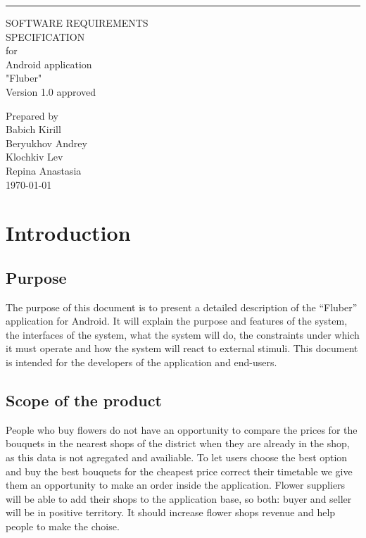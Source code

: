 \documentclass{scrreprt}
\date{}
\def\myversion{1.0 }
\begin{document}
\begin{flushright}
   \rule{16cm}{5pt}\vskip1cm
    \begin{bfseries}
        \thispagestyle{empty} %
        \begin{center}
        \Huge{SOFTWARE REQUIREMENTS\\ SPECIFICATION}\\
        for\\
        \vspace{1.9cm}
        Android application\\ "Fluber"\\
        \vspace{1.9cm}
        \LARGE{Version \myversion approved}\\
        \vspace{1.9cm}
        \end{center}
        Prepared by \\
        
        Babich Kirill\\
        Beryukhov Andrey\\
        Klochkiv Lev\\
        Repina Anastasia\\

        \vspace{1.9cm}
        \today\\
    \end{bfseries}
\end{flushright}


\tableofcontents
\setcounter{page}{1}

\pagestyle{fancy} 
\chapter{Introduction}
\section{Purpose}
The purpose of this document is to present a detailed description of the “Fluber” application for Android. It will explain the purpose and features of the system, the interfaces of the system, what the system will do, the constraints under which it must operate and how the system will react to external stimuli. This document is intended for the developers of the application and end-users.

\section{Scope of the product}
People who buy flowers do not have an opportunity to compare the prices for the bouquets in the nearest shops of the district when they are already in the shop, as this data is not agregated and availiable. To let users choose the best option and buy the best bouquets for the cheapest price correct their timetable we give them an opportunity to make an order inside the application. Flower suppliers will be able to add their shops to the application base, so both: buyer and seller will be in positive territory. It should increase flower shops revenue and help people to make the choise.
\end{document}
